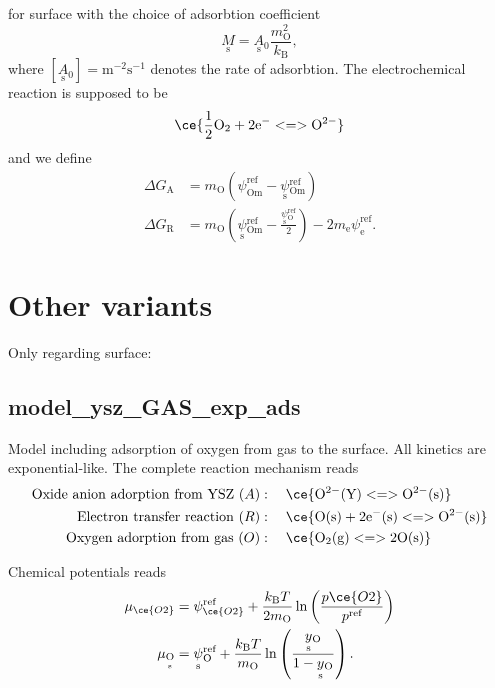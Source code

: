 \documentclass{article}
\numberwithin{equation}{section}
\newcommand{\us}[1]{\underset{\textrm{s}}{#1}{}}
\def\kB{k_\mathrm{B}}
\def\Ox{\mathrm{O}}
\newcommand{\OO}{{\ce{O2}}}
\def\yOs{{\us y_\textrm{O}}}
\def\pO2{{p\OO}}
\def\DGA{\Delta G_\textrm{A}  }
\def\DGR{\Delta G_\textrm{R}  }
\def\REF{\textrm{ref}}
\begin{document}
for surface with the choice of adsorbtion coefficient
$$
\us M = \us A_0  \frac{m_\Ox^2}{\kB},
$$
where $[\us A_0] = \textrm{m}^{-2} \textrm{s}^{-1}$ denotes the rate of adsorbtion. The electrochemical reaction is supposed to be
\begin{align}
\ce{\frac{1}{2} \Ox_2 + 2\textrm{e}^- <=> \Ox^{2-}}
\end{align}
and we define
\begin{subequations}
\begin{align}
\DGA
&=
m_\Ox
\left(
	\psi_{\textrm{Om}}^\REF
	-
	\us \psi_{\textrm{Om}}^\REF
\right)
\\
\DGR
&= 
m_\Ox
\left(
	\us \psi_{\textrm{Om}}^\REF
	-
	\frac{\us \psi_{\Ox}^\REF}{2}
\right)
-
2 m_\textrm{e} \psi_{\textrm{e}}^\REF.
\end{align}
\end{subequations}




\section{Other variants}
Only regarding surface:

\newcommand{\surf}{\mathrm{s}}
\newcommand{\Y}{\mathrm{Y}}
\newcommand{\gas}{\mathrm{g}}
\subsection{model\_ysz\_GAS\_exp\_ads}
Model including adsorption of oxygen  from gas to the surface. All kinetics are exponential-like. The complete reaction mechanism reads
\begin{subequations}
\begin{align}
\mathrm{Oxide \ anion \ adorption \ from \ YSZ} \ (A) &: \quad 
\ce{\Ox^{2-}(\Y) <=> \Ox^{2-}(\surf)}
\\
\mathrm{Electron \ transfer \ reaction}\ (R) &: \quad 
\ce{\textrm{O}(\surf) +  2\textrm{e}^-(\surf) <=> \Ox^{2-}(\surf)}
\\
\mathrm{Oxygen \ adorption \ from \ gas}\  (O) &: \quad 
\ce{\Ox_2({\gas}) <=> 2 \Ox(\surf)}
\\
\end{align}
\end{subequations}

Chemical potentials reads
\begin{subequations}
\begin{align}
\mu_{\OO} &= \psi_{\OO}^\REF + \frac{\kB T}{2 m_\Ox}\ln 
\left( 
    \frac{\pO2}{p^\REF} 
\right)
\\
\mu_{\us \Ox} 
&= 
\us \psi_{\Ox}^\REF 
+ 
\frac{\kB T}{m_\Ox} \ln 
\left(  
	\frac{\yOs}{1-\yOs}
\right).
\end{align}
\end{subequations}
\end{document}
